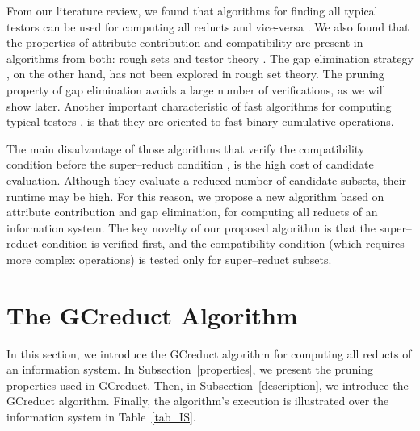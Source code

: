 \documentclass[authoryear,preprint,review,12pt]{elsarticle}
\begin{document}
  From our literature review, we found that algorithms for finding all typical testors can be used for computing all reducts and vice-versa \citep{Lazo15}. We also found that the properties of attribute contribution and compatibility are present in algorithms from both: rough sets \citep{WangP07} and testor theory \citep{Sanchez10,Lias13}. The gap elimination strategy \citep{Santiesteban03,Lias13}, on the other hand, has not been explored in rough set theory. The pruning property of gap elimination avoids a large number of verifications, as we will show later. Another important characteristic of fast algorithms for computing typical testors \citep{Sanchez10,Lias13}, is that they are oriented to fast binary cumulative operations. 
  
  The main disadvantage of those algorithms that verify the compatibility condition before the super--reduct condition \citep{Santiesteban03,WangP07,Lias13}, is the high cost of candidate evaluation. Although they evaluate a reduced number of candidate subsets, their runtime may be high. For this reason, we propose a new algorithm based on attribute contribution and gap elimination, for computing all reducts of an information system. The key novelty of our proposed algorithm is that the super--reduct condition is verified first, and the compatibility condition (which requires more complex operations) is tested only for super--reduct subsets.
  
  
\section{The GCreduct Algorithm}\label{GCreduct}
  In this section, we introduce the GCreduct algorithm for computing all reducts of an information system. In  Subsection~\ref{properties}, we present the pruning properties used in GCreduct. Then, in Subsection~\ref{description}, we introduce the GCreduct algorithm. Finally, the algorithm's execution is illustrated over the information system in Table~\ref{tab_IS}.
  
\end{document}
